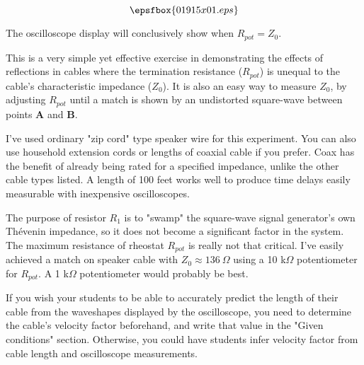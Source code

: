 

$$\epsfbox{01915x01.eps}$$

\vfil \eject






The oscilloscope display will conclusively show when $R_{pot} = Z_0$.







This is a very simple yet effective exercise in demonstrating the effects of reflections in cables where the termination resistance ($R_{pot}$) is unequal to the cable's characteristic impedance ($Z_0$).  It is also an easy way to measure $Z_0$, by adjusting $R_{pot}$ until a match is shown by an undistorted square-wave between points {\bf A} and {\bf B}.

I've used ordinary "zip cord" type speaker wire for this experiment.  You can also use household extension cords or lengths of coaxial cable if you prefer.  Coax has the benefit of already being rated for a specified impedance, unlike the other cable types listed.  A length of 100 feet works well to produce time delays easily measurable with inexpensive oscilloscopes.

The purpose of resistor $R_1$ is to "swamp" the square-wave signal generator's own Th\'evenin impedance, so it does not become a significant factor in the system.  The maximum resistance of rheostat $R_{pot}$ is really not that critical.  I've easily achieved a match on speaker cable with $Z_0 \approx 136 \> \Omega$ using a 10 k$\Omega$ potentiometer for $R_{pot}$.  A 1 k$\Omega$ potentiometer would probably be best.

If you wish your students to be able to accurately predict the length of their cable from the waveshapes displayed by the oscilloscope, you need to determine the cable's velocity factor beforehand, and write that value in the "Given conditions" section.  Otherwise, you could have students infer velocity factor from cable length and oscilloscope measurements.





